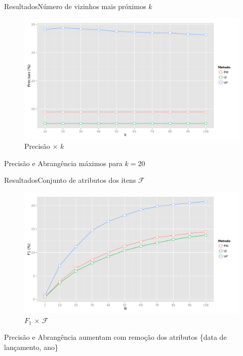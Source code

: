 \begin{frame}{Resultados}{Número de vizinhos mais próximos $k$}
\begin{figure}[ht]
    \begin{center}
    \includegraphics[width=.8\textwidth]{../img/precision_k}
    \end{center}
    \caption{Precisão $\times$ $k$}
    \label{fig:F1_H}
\end{figure}
\begin{center}
    Precisão e Abrangência máximos para $k=20$
\end{center}
\end{frame}

\begin{frame}{Resultados}{Conjunto de atributos dos itens  $\mathcal{F}$}
\begin{figure}[ht]
    \begin{center}
    \includegraphics[width=.8\textwidth]{../img/F1_N_F}
    \end{center}
    \caption{$F_1$ $\times$ $\mathcal{F}$}
    \label{fig:F1_N_F}
\end{figure}
\begin{center}
    Precisão e Abrangência aumentam com remoção dos atributos \{data de lançamento, ano\}
\end{center}
\end{frame}

